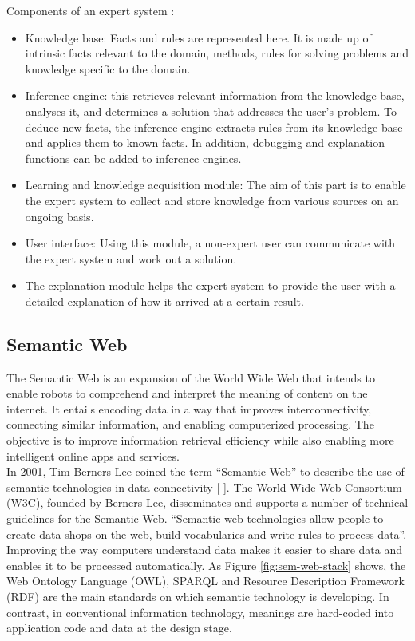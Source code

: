 Components of an expert system : 
\begin{itemize}
    \item Knowledge base: Facts and rules are represented here. It is made up of intrinsic facts relevant to the domain, methods, rules for solving problems and knowledge specific to the domain.
    \item Inference engine: this retrieves relevant information from the knowledge base, analyses it, and determines a solution that addresses the user's problem. To deduce new facts, the inference engine extracts rules from its knowledge base and applies them to known facts. In addition, debugging and explanation functions can be added to inference engines.
    \item Learning and knowledge acquisition module: The aim of this part is to enable the expert system to collect and store knowledge from various sources on an ongoing basis.
    \item User interface: Using this module, a non-expert user can communicate with the expert system and work out a solution.
    \item The explanation module helps the expert system to provide the user with a detailed explanation of how it arrived at a certain result.
\end{itemize}


\subsection{Semantic Web\label{sec:semweb}}
The Semantic Web is an expansion of the World Wide Web that intends to enable robots to comprehend and interpret the meaning of content on the internet. It entails encoding data in a way that improves interconnectivity, connecting similar information, and enabling computerized processing. The objective is to improve information retrieval efficiency while also enabling more intelligent online apps and services.\\

In 2001, Tim Berners-Lee coined the term “Semantic Web” to describe the use of semantic technologies in data connectivity [ ]. The World Wide Web Consortium (W3C), founded by Berners-Lee, disseminates and supports a number of technical guidelines for the Semantic Web. “Semantic web technologies allow people to create data shops on the web, build vocabularies and write rules to process data”.\\

Improving the way computers understand data makes it easier to share data and enables it to be processed automatically. As Figure \ref{fig:sem-web-stack} shows, the Web Ontology Language (OWL), SPARQL and Resource Description Framework (RDF) are the main standards on which semantic technology is developing. In contrast, in conventional information technology, meanings are hard-coded into application code and data at the design stage. \\

